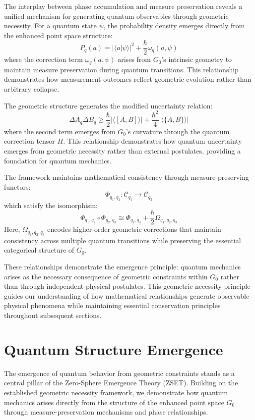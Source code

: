 \documentclass[10pt]{article}
\begin{document}
The interplay between phase accumulation and measure preservation reveals a unified mechanism for generating quantum observables through geometric necessity. For a quantum state \(\psi\), the probability density emerges directly from the enhanced point space structure:
\[
P_q(a) = |\langle a | \psi \rangle|^2 + \frac{\hbar}{2}\omega_q(a, \psi)
\]
where the correction term \(\omega_q(a, \psi)\) arises from \(G_0\)'s intrinsic geometry to maintain measure preservation during quantum transitions. This relationship demonstrates how measurement outcomes reflect geometric evolution rather than arbitrary collapse.

The geometric structure generates the modified uncertainty relation:
\[
\Delta A_q \Delta B_q \geq \frac{\hbar}{2}|\langle [A, B] \rangle| + \frac{\hbar^2}{4}|\langle \{A, B\} \rangle|
\]
where the second term emerges from \(G_0\)'s curvature through the quantum correction tensor \(\Pi\). This relationship demonstrates how quantum uncertainty emerges from geometric necessity rather than external postulates, providing a foundation for quantum mechanics.

The framework maintains mathematical consistency through measure-preserving functors:
\[
\Phi_{q_1,q_2}: \mathcal{C}_{q_1} \to \mathcal{C}_{q_2}
\]
which satisfy the isomorphism:
\[
\Phi_{q_1,q_2} \circ \Phi_{q_2,q_3} \cong \Phi_{q_1,q_3} + \frac{\hbar}{2}\Omega_{q_1,q_2,q_3}
\]
Here, \(\Omega_{q_1,q_2,q_3}\) encodes higher-order geometric corrections that maintain consistency across multiple quantum transitions while preserving the essential categorical structure of \(G_0\).

These relationships demonstrate the emergence principle: quantum mechanics arises as the necessary consequence of geometric constraints within \(G_0\) rather than through independent physical postulates. This geometric necessity principle guides our understanding of how mathematical relationships generate observable physical phenomena while maintaining essential conservation principles throughout subsequent sections.

\section{Quantum Structure Emergence}

The emergence of quantum behavior from geometric constraints stands as a central pillar of the Zero-Sphere Emergence Theory (ZSET). Building on the established geometric necessity framework, we demonstrate how quantum mechanics arises directly from the structure of the enhanced point space $G_0$ through measure-preservation mechanisms and phase relationships.
\end{document}
